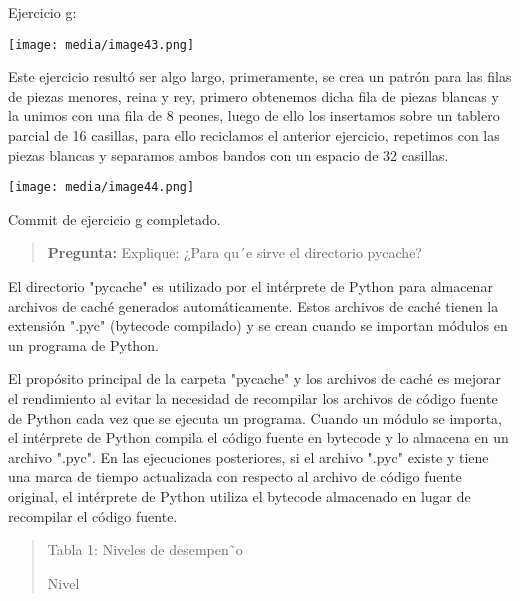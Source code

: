 \documentclass[
]{article}
\begin{document}
Ejercicio g:

\texttt{[image: media/image43.png]}

Este ejercicio resultó ser algo largo, primeramente, se crea un patrón
para las filas de piezas menores, reina y rey, primero obtenemos dicha
fila de piezas blancas y la unimos con una fila de 8 peones, luego de
ello los insertamos sobre un tablero parcial de 16 casillas, para ello
reciclamos el anterior ejercicio, repetimos con las piezas blancas y
separamos ambos bandos con un espacio de 32 casillas.

\texttt{[image: media/image44.png]}

Commit de ejercicio g completado.

\begin{quote}
\textbf{Pregunta:} Explique: ¿Para qu´e sirve el directorio pycache?
\end{quote}

El directorio "pycache" es utilizado por el intérprete de Python para
almacenar archivos de caché generados automáticamente. Estos archivos de
caché tienen la extensión ".pyc" (bytecode compilado) y se crean cuando
se importan módulos en un programa de Python.

El propósito principal de la carpeta "pycache" y los archivos de caché
es mejorar el rendimiento al evitar la necesidad de recompilar los
archivos de código fuente de Python cada vez que se ejecuta un programa.
Cuando un módulo se importa, el intérprete de Python compila el código
fuente en bytecode y lo almacena en un archivo ".pyc". En las
ejecuciones posteriores, si el archivo ".pyc" existe y tiene una marca
de tiempo actualizada con respecto al archivo de código fuente original,
el intérprete de Python utiliza el bytecode almacenado en lugar de
recompilar el código fuente.

\begin{quote}
Tabla 1: Niveles de desempen˜o

Nivel
\end{quote}
\end{document}
